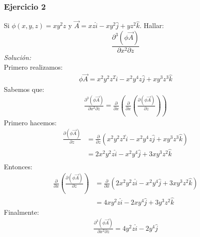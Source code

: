 \documentclass[12pt,openany]{book}
\begin{document}
			\subsubsection{Ejercicio 2}
				Si $\phi(x,y,z)=xy^{2}z$ y $\vec{A}=xz\hat{i}-xy^{2}\hat{j}+yz^{2}\hat{k}$. Hallar:
				$$
					\frac{\partial^{3} (\phi\vec{A})}{\partial x^{2}\partial z}
				$$
				\textsl{Soluci\'on:}		\\
				Primero realizamos:
				\begin{equation*}
					\begin{split}
						\phi\vec{A}=x^{2}y^{2}z^{2}\hat{i}-x^{2}y^{4}z\hat{j}+xy^{3}z^{3}\hat{k}
					\end{split}
				\end{equation*}
				Sabemos que:
				\begin{equation*}
					\begin{split}
						\frac{\partial^{3}(\phi\vec{A})}{\partial x^{2}\partial z}=
										\frac{\partial}{\partial x}\left
											(\frac{\partial}{\partial x}\left(\frac{\partial (\phi\vec{A})}{\partial z}\right)
										\right)
					\end{split}
				\end{equation*}
				Primero hacemos:
				\begin{equation*}
					\begin{split}
						\frac{\partial (\phi\vec{A})}{\partial z}&=\frac{\partial}{\partial z}(x^{2}y^{2}z^{2}\hat{i}-
																	x^{2}y^{4}z\hat{j}+xy^{3}z^{3}\hat{k}) \\
															     &=2x^{2}y^{2}z\hat{i}-x^{2}y^{4}\hat{j}+3xy^{3}z^{2}\hat{k}							     \\
					\end{split}
				\end{equation*}
				Entonces:
				\begin{equation*}
					\begin{split}
						\frac{\partial}{\partial x}\left(\frac{\partial (\phi\vec{A})}{\partial z}\right)
								&=\frac{\partial}{\partial x}\left(2x^{2}y^{2}z\hat{i}-x^{2}y^{4}\hat{j}+3xy^{3}z^{2}\hat{k}\right)	\\
								&=4xy^{2}z\hat{i}-2xy^{4}\hat{j}+3y^{3}z^{2}\hat{k}
					\end{split}
				\end{equation*}
				Finalmente:
				\begin{equation*}
					\begin{split}
							\frac{\partial^{3}(\phi\vec{A})}{\partial x^{2}\partial z}=4y^{2}z\hat{i}-2y^{4}\hat{j}
					\end{split}
				\end{equation*}
	
\end{document}
